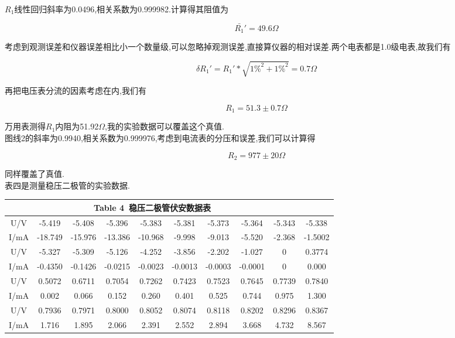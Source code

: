 \documentclass[a4paper,10pt,notitlepage]{report}
\begin{document}
	$R_1$线性回归斜率为0.0496,相关系数为0.999982.计算得其阻值为
	
\begin{equation}
	\bar{R_1}' = 49.6\Omega
\end{equation}

	考虑到观测误差和仪器误差相比小一个数量级,可以忽略掉观测误差,直接算仪器的相对误差.两个电表都是1.0级电表,故我们有
	
\begin{equation}
	\delta R_1' = R_1' * \sqrt{1\%^2 + 1\%^2} = 0.7\Omega
\end{equation}

	再把电压表分流的因素考虑在内,我们有
	
\begin{equation}
	R_1 = 51.3 \pm 0.7\Omega
\end{equation}

	万用表测得$R_1$内阻为51.92$\Omega$,我的实验数据可以覆盖这个真值. \\
	
	图线2的斜率为0.9940,相关系数为0.999976,考虑到电流表的分压和误差,我们可以计算得
	
\begin{equation}
	R_2 = 977 \pm 20 \Omega
\end{equation}

	同样覆盖了真值. \\
	
	表四是测量稳压二极管的实验数据. \\
	
\begin{table}[bhtp]
\centering
	\begin{tabular}{|c|c|c|c|c|c|c|c|c|c|}
	
	\multicolumn{9}{c}{Table 4\ 稳压二极管伏安数据表} \\
	\hline
	U/V & -5.419 & -5.408 & -5.396 & -5.383 & -5.381 & -5.373 & -5.364 & -5.343 & -5.338 \\
	\hline
	I/mA & -18.749 & -15.976 & -13.386 & -10.968 & -9.998 & -9.013 & -5.520 & -2.368 & -1.5002 \\
	\hline
	\hline
	U/V & -5.327 & -5.309 & -5.126 & -4.252 & -3.856 & -2.202 & -1.027 & 0 & 0.3774 \\
	\hline
	I/mA & -0.4350 & -0.1426 & -0.0215 & -0.0023 & -0.0013 & -0.0003 & -0.0001 & 0  & 0.000\\
	\hline
	\hline
	U/V & 0.5072 & 0.6711 & 0.7054 & 0.7262 & 0.7423 & 0.7523 & 0.7645 & 0.7739 & 0.7840 \\
	\hline
	I/mA & 0.002 & 0.066 & 0.152 & 0.260 & 0.401 & 0.525 & 0.744 & 0.975 & 1.300 \\
	\hline
	\hline
	U/V & 0.7936 & 0.7971 & 0.8000 & 0.8052 & 0.8074 & 0.8118 & 0.8202 & 0.8296 & 0.8367 \\
	\hline
	I/mA & 1.716 & 1.895 & 2.066 & 2.391 & 2.552 & 2.894 & 3.668 & 4.732 & 8.567 \\
	\hline
	
	\end{tabular}
\end{table}
\end{document}
